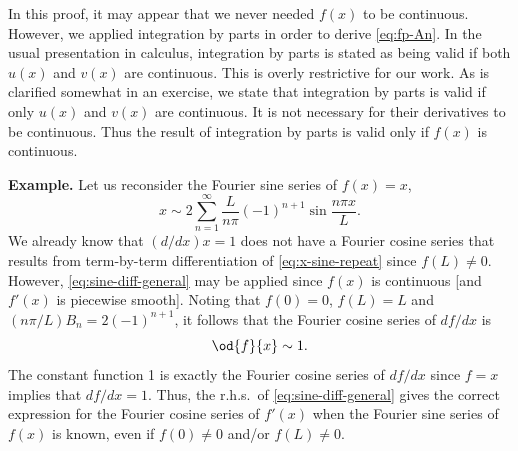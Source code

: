 \begin{center}
\end{center}

In this proof, it may appear that we never needed $f(x)$ to be continuous.  However, we applied integration by parts in order to derive \eqref{eq:fp-An}.  In the usual presentation in calculus, integration by parts is stated as being valid if both $u(x)$ and $v(x)$ are continuous.  This is overly restrictive for our work.  As is clarified somewhat in an exercise, we state that integration by parts is valid if only $u(x)$ and $v(x)$ are continuous.  It is not necessary for their derivatives to be continuous.  Thus the result of integration by parts is valid only if $f(x)$ is continuous.

\textbf{Example.}  Let us reconsider the Fourier sine series of $f(x) = x$,
\begin{equation}
\label{eq:x-sine-repeat}
x \sim 2\sum_{n=1}^{\infty} \frac{L}{n\pi}(-1)^{n+1} \sin \frac{n\pi x}{L}.
\end{equation}
We already know that $(d/dx)x = 1$ does not have a Fourier cosine series that results from term-by-term differentiation of \eqref{eq:x-sine-repeat} since $f(L) \ne 0$.  However, \eqref{eq:sine-diff-general} may be applied since $f(x)$ is continuous [and $f'(x)$ is piecewise smooth].  Noting that $f(0) = 0$, $f(L) = L$ and $(n\pi/L)B_n = 2(-1)^{n+1}$, it follows that the Fourier cosine series of $df/dx$ is
\[
\od{f}{x} \sim 1.
\]
The constant function 1 is exactly the Fourier cosine series of $df/dx$ since $f = x$ implies that $df/dx = 1$.  Thus, the r.h.s.\ of \eqref{eq:sine-diff-general} gives the correct expression for the Fourier cosine series of $f'(x)$ when the Fourier sine series of $f(x)$ is known, even if $f(0) \ne 0$ and/or $f(L) \ne 0$.

